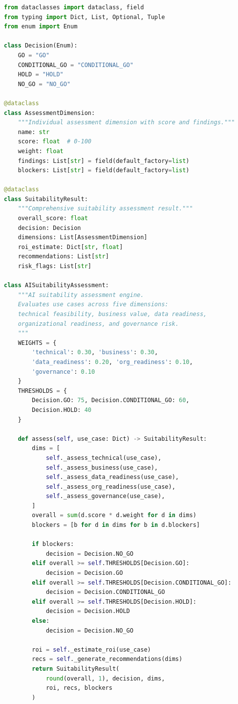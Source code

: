 \begin{lstlisting}[language=Python, caption={AI 종합 적합성 점수 산출 엔진(Suitability Assessment Engine)}, label={lst:suitability_eval}]
from dataclasses import dataclass, field
from typing import Dict, List, Optional, Tuple
from enum import Enum

class Decision(Enum):
    GO = "GO"
    CONDITIONAL_GO = "CONDITIONAL_GO"
    HOLD = "HOLD"
    NO_GO = "NO_GO"

@dataclass
class AssessmentDimension:
    """Individual assessment dimension with score and findings."""
    name: str
    score: float  # 0-100
    weight: float
    findings: List[str] = field(default_factory=list)
    blockers: List[str] = field(default_factory=list)

@dataclass
class SuitabilityResult:
    """Comprehensive suitability assessment result."""
    overall_score: float
    decision: Decision
    dimensions: List[AssessmentDimension]
    roi_estimate: Dict[str, float]
    recommendations: List[str]
    risk_flags: List[str]

class AISuitabilityAssessment:
    """AI suitability assessment engine.
    Evaluates use cases across five dimensions:
    technical feasibility, business value, data readiness,
    organizational readiness, and governance risk.
    """
    WEIGHTS = {
        'technical': 0.30, 'business': 0.30,
        'data_readiness': 0.20, 'org_readiness': 0.10,
        'governance': 0.10
    }
    THRESHOLDS = {
        Decision.GO: 75, Decision.CONDITIONAL_GO: 60,
        Decision.HOLD: 40
    }

    def assess(self, use_case: Dict) -> SuitabilityResult:
        dims = [
            self._assess_technical(use_case),
            self._assess_business(use_case),
            self._assess_data_readiness(use_case),
            self._assess_org_readiness(use_case),
            self._assess_governance(use_case),
        ]
        overall = sum(d.score * d.weight for d in dims)
        blockers = [b for d in dims for b in d.blockers]

        if blockers:
            decision = Decision.NO_GO
        elif overall >= self.THRESHOLDS[Decision.GO]:
            decision = Decision.GO
        elif overall >= self.THRESHOLDS[Decision.CONDITIONAL_GO]:
            decision = Decision.CONDITIONAL_GO
        elif overall >= self.THRESHOLDS[Decision.HOLD]:
            decision = Decision.HOLD
        else:
            decision = Decision.NO_GO

        roi = self._estimate_roi(use_case)
        recs = self._generate_recommendations(dims)
        return SuitabilityResult(
            round(overall, 1), decision, dims,
            roi, recs, blockers
        )


\end{lstlisting}
